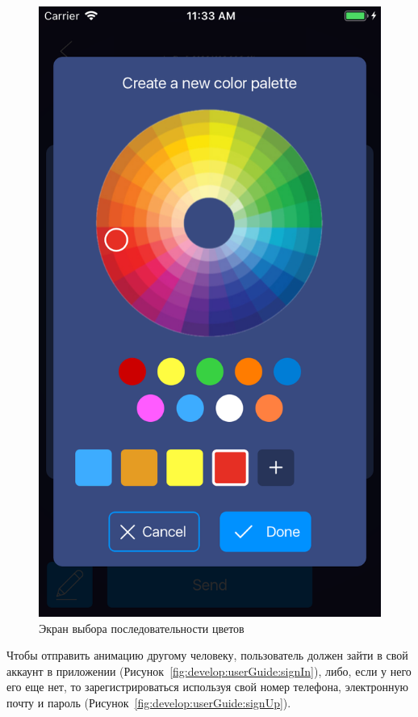\begin{figure}[H]
\centering
	\includegraphics[scale=0.2]{figures/userGuide/editingColorSequence.png}
	\caption{Экран выбора последовательности цветов}
	\label{fig:develop:userGuide:editingColorSequence}
\end{figure}
\vspace*{-1pt}
Чтобы отправить анимацию другому человеку, пользователь должен зайти в свой аккаунт в приложении (Рисунок~\ref{fig:develop:userGuide:signIn}), либо, если у него его еще нет, то зарегистрироваться используя свой номер телефона, электронную почту и пароль (Рисунок~\ref{fig:develop:userGuide:signUp}).

